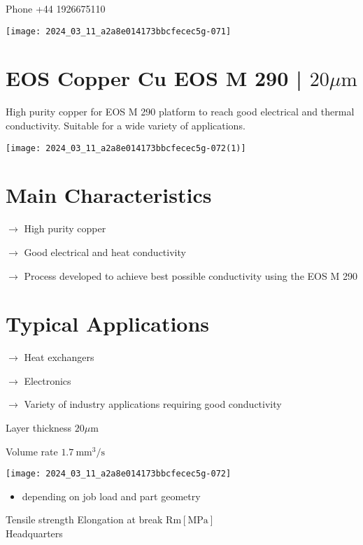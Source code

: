 \documentclass[10pt]{article}
\begin{document}
Phone +44 1926675110

\begin{center}
\texttt{[image: 2024\_03\_11\_a2a8e014173bbcfecec5g-071]}
\end{center}

\section*{EOS Copper Cu EOS M 290 | $20 \mu \mathrm{m}$}
High purity copper for EOS M 290 platform to reach good electrical and thermal conductivity. Suitable for a wide variety of applications.

\begin{center}
\texttt{[image: 2024\_03\_11\_a2a8e014173bbcfecec5g-072(1)]}
\end{center}

\section*{Main Characteristics}
$\longrightarrow$ High purity copper

$\longrightarrow$ Good electrical and heat conductivity

$\longrightarrow$ Process developed to achieve best possible conductivity using the EOS M 290

\section*{Typical Applications}
$\longrightarrow$ Heat exchangers

$\longrightarrow$ Electronics

$\longrightarrow$ Variety of industry applications requiring good conductivity

Layer thickness $20 \mu \mathrm{m}$

Volume rate $1.7 \mathrm{~mm}^{3} / \mathrm{s}$

\begin{center}
\texttt{[image: 2024\_03\_11\_a2a8e014173bbcfecec5g-072]}
\end{center}

\begin{itemize}
  \item depending on job load and part geometry
\end{itemize}

Tensile strength Elongation at break $\mathrm{Rm}[\mathrm{MPa}]$\\
Headquarters
\end{document}
